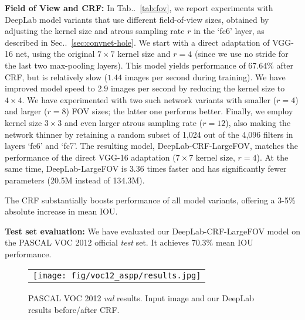 \documentclass[10pt,journal,compsoc]{IEEEtran}
\makeatletter
\newcommand{\secref}[1]{Sec\onedot~\ref{#1}}
\newcommand{\tabref}[1]{Tab\onedot~\ref{#1}}
\newcommand{\by}[2]{\ensuremath{#1 \! \times \! #2}}
\def\onedot{\ifx\@let@token.\else.\null\fi\xspace}
\makeatother
\begin{document}
\textbf{Field of View and CRF:}
 In \tabref{tab:fov}, we report experiments with DeepLab model variants that use
different field-of-view sizes, obtained by adjusting the kernel size and atrous
sampling rate $r$ in the `fc6' layer, as described in \secref{sec:convnet-hole}.
We start with a direct adaptation of VGG-16 net, using the original \by{7}{7}
kernel size and $r = 4$ (since we use no stride for the last two max-pooling
layers). This model yields performance of $67.64\%$ after CRF, but is relatively
slow ($1.44$ images per second during training). We have improved model speed to
$2.9$ images per second by reducing the kernel size to \by{4}{4}. We have
experimented with two such network variants with smaller ($r = 4$) and larger
($r = 8$) FOV sizes; the latter one performs better. Finally, we employ kernel
size \by{3}{3} and even larger atrous sampling rate ($r = 12$), also making the
network thinner by retaining a random subset of 1,024 out of the 4,096 filters
in layers `fc6' and `fc7'. The resulting model, DeepLab-CRF-LargeFOV, matches
the performance of the direct VGG-16 adaptation (\by{7}{7} kernel size, $r = 4$).
At the same time, DeepLab-LargeFOV is $3.36$ times faster and has significantly
fewer parameters (20.5M instead of 134.3M).

The CRF substantially boosts performance of all model variants, offering a 3-5\%
absolute increase in mean IOU.














\textbf{Test set evaluation:} We have evaluated our DeepLab-CRF-LargeFOV model
on the PASCAL VOC 2012 official \textit{test} set. It achieves $70.3\%$ mean IOU
performance.















\begin{figure*}[!htbp]
  \centering
\scalebox{0.55} {
  \begin{tabular}{c}
    \texttt{[image: fig/voc12\_aspp/results.jpg]}\\
  \end{tabular}
  }
\caption{PASCAL VOC 2012 \textit{val} results. Input image
    and our DeepLab results before/after CRF.}
  \label{fig:ValResults}
\end{figure*}
\end{document}
